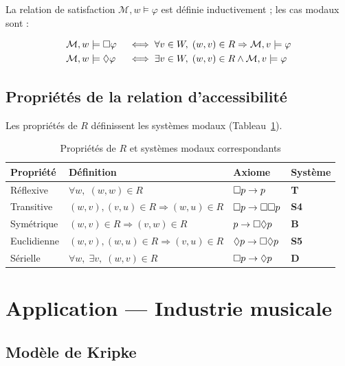 \noindent La relation de satisfaction $\mathcal{M}, w \models \varphi$ est définie
inductivement ; les cas modaux sont :

\begin{align*}
  \mathcal{M}, w &\models \Box\varphi
    &&\iff \forall v \in W,\; (w, v) \in R \Rightarrow \mathcal{M}, v \models \varphi \\
  \mathcal{M}, w &\models \Diamond\varphi
    &&\iff \exists v \in W,\; (w, v) \in R \land \mathcal{M}, v \models \varphi
\end{align*}

\subsection{Propriétés de la relation d'accessibilité}

Les propriétés de $R$ définissent les systèmes modaux (Tableau~\ref{tab:modal-systems}).

\begin{table}[H]
\centering
\caption{Propriétés de $R$ et systèmes modaux correspondants}
\label{tab:modal-systems}
\begin{tabular}{llll}
\toprule
\textbf{Propriété} & \textbf{Définition} & \textbf{Axiome} & \textbf{Système} \\
\midrule
Réflexive   & $\forall w,\; (w,w) \in R$               & $\Box p \to p$        & \textbf{T}  \\
Transitive  & $(w,v),(v,u) \in R \Rightarrow (w,u) \in R$ & $\Box p \to \Box\Box p$ & \textbf{S4} \\
Symétrique  & $(w,v) \in R \Rightarrow (v,w) \in R$   & $p \to \Box\Diamond p$    & \textbf{B}  \\
Euclidienne & $(w,v),(w,u) \in R \Rightarrow (v,u) \in R$ & $\Diamond p \to \Box\Diamond p$ & \textbf{S5} \\
Sérielle    & $\forall w,\; \exists v,\; (w,v) \in R$  & $\Box p \to \Diamond p$   & \textbf{D}  \\
\bottomrule
\end{tabular}
\end{table}

\section{Application — Industrie musicale}

\subsection{Modèle de Kripke}

